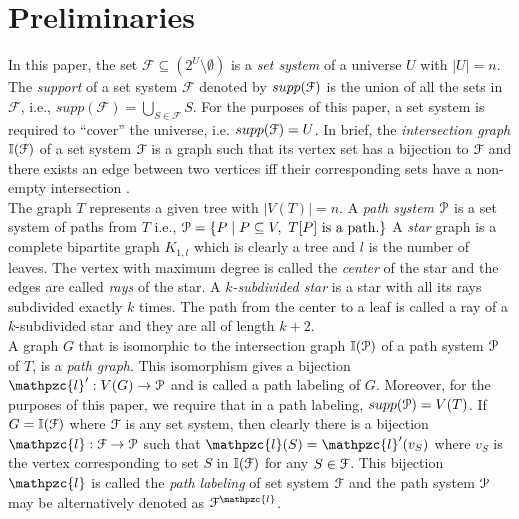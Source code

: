 \documentclass[a4paper,UKenglish,numberwithinsect]{lipics} %
\def\cF{{\cal F}}
\def\cP{{\cal P}}
\def\F{{\mathcal F}}
\def\bI{\mathbb I}
\def\cl{\mathpzc{l}}
\begin{document}
\section{Preliminaries} \label{sec:prelims} 
\noindent
In this paper, the set $\F \subseteq (2^{U} \setminus \emptyset)$ is a
{\em set system} of a universe $U$ with $|U| = n$. 
The {\em support} of a set system $\F$ denoted by  $supp(\cF)$ is the
union of all the sets in $\F$, i.e., $supp(\F) =
\bigcup_{S \in \F}S$.
For the purposes of this paper, a set system is required to ``cover'' the universe,
i.e. $ supp(\cF) = U$. In brief, the {\em intersection graph} $\bI(\cF)$ of a
set system $\cF$ is a graph such that its vertex set has a bijection
to $\cF$ and there exists an edge between two vertices iff their
corresponding sets have a non-empty
intersection \cite{mcg04}. \\
\noindent
The graph $T$ represents a given tree with $|V(T)| = n$. 
A {\em path system} $\cP$ is a set system of paths from
$T$ i.e., $\cP = \{P \mid P \subseteq V, \text{ } T[P]
\text{ is a path.} \}$
\noindent
A {\em star} graph is a complete bipartite graph $K_{1,l}$ which is
clearly a tree and $l$ is the number of leaves. The vertex with
maximum degree is called the {\em center} of the star and the edges
are called {\em rays} of the star.  A {\em $k$-subdivided star} is a
star with all its rays subdivided exactly $k$ times. The path from the
center to a leaf is called a ray of a
$k$-subdivided star and they are all of length $k+2$.\\
\noindent
A graph $G$ that is isomorphic to the intersection graph $\bI(\cP)$ of a
path system $\cP$ of $T$, is a {\em path graph}. This
isomorphism gives a bijection $\cl': V(G) \rightarrow \cP$ and is
called a path labeling of $G$. Moreover, for the purposes of this paper, we
require that in a path labeling, $supp(\cP) = V(T)$. 
If $G = \bI(\cF)$ where $\cF$ is any set system, then clearly there is
a bijection $\cl: \cF \rightarrow \cP$ such that $\cl(S) = \cl'(v_S)$
where $v_S$ is the vertex corresponding to set $S$ in $\bI(\cF)$ for
any $S \in \cF$. 
This bijection $\cl$ is called the {\em path labeling} of set system
$\cF$ and the path system $\cP$ may be alternatively denoted as
$\cF^\cl$. 
 
\end{document}
